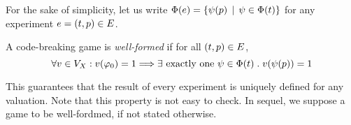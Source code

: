 For the sake of simplicity, let us write $\Phi(e) = \{ \psi(p) \:\:|\:\: \psi\in\Phi(t)\}$ for any experiment
$e = (t, p) \in E$.

A code-breaking game is \emph{well-formed} if for all $(t, p) \in E$,
\begin{equation} \label{prop-outcome}
\forall v\in V_X:  v(\varphi_0) = 1 ==> \exists \textrm{ exactly one }\psi\in\Phi(t)\;.\; v(\psi(p)) = 1
\end{equation}

This guarantees that the result of every experiment is uniquely defined for any valuation.
Note that this property is not easy to check.
In sequel, we suppose a game to be well-fordmed, if not stated otherwise.


